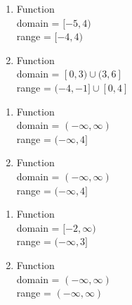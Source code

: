 \begin{multicols}{2}
\begin{enumerate}
\setcounter{enumi}{\value{HW}}

\item  Function \\  domain =  $[-5,4)$ \\ range =  $[-4,4)$

\vfill

\columnbreak

\item  Function \\ domain = $[0,3) \cup (3,6]$ \\ range = $(-4,-1] \cup [0,4]$

\setcounter{HW}{\value{enumi}}
\end{enumerate}
\end{multicols}


\begin{multicols}{2}
\begin{enumerate}
\setcounter{enumi}{\value{HW}}

\item  Function \\  domain =  $(-\infty, \infty)$ \\ range =  $(-\infty, 4]$

\vfill

\columnbreak

\item  Function \\ domain = $(-\infty, \infty)$ \\ range = $(-\infty, 4]$

\setcounter{HW}{\value{enumi}}
\end{enumerate}
\end{multicols}


\begin{multicols}{2}
\begin{enumerate}
\setcounter{enumi}{\value{HW}}

\item  Function \\  domain =  $[-2, \infty)$ \\ range =  $(-\infty, 3]$

\vfill

\columnbreak

\item  Function \\ domain = $(-\infty, \infty)$ \\ range = $(-\infty, \infty)$

\setcounter{HW}{\value{enumi}}
\end{enumerate}
\end{multicols}


